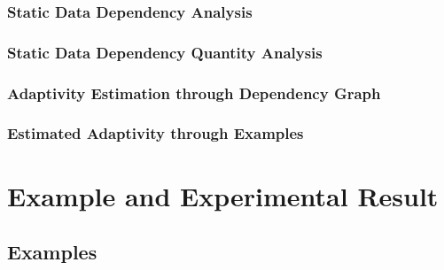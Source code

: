 \documentclass[12pt, letterpaper]{report}   %
\begin{document}
% 

\subsection{Static Data Dependency Analysis}
\label{sec:static-dep}
% 


\subsection{Static Data Dependency Quantity Analysis}
\label{sec:static-quantity}


\subsection{Adaptivity Estimation through Dependency Graph}
\label{sec:static-adapt}


% 

\subsection{Estimated Adaptivity through Examples}
\label{sec:static-examples}


% 

\clearpage
\chapter{Example and Experimental Result }
\label{sec:adapt-implementation}
\section{Examples}
\label{sec:adapt-example}

\end{document}
